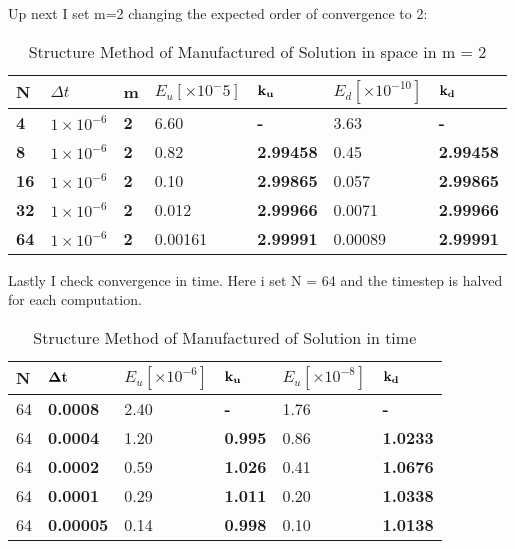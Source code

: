 Up next I set m=2 changing the expected order of convergence to 2:

\begin{table}[H]
\centering
\caption{Structure Method of Manufactured of Solution in space in m = 2}
\label{my-label}
\begin{tabular}{|l|l|l|l|l|l|l|}
\hline
\textbf{N} & $\Delta t$ & \textbf{m} & $E_u [\times 10^-5]$ & $\bold{k_u}$ & $E_d [\times 10^{-10}]$ & $\bold{k_d}$ \\ \hline
\textbf{4} & $1\times10^{-6}$ & \textbf{2} & 6.60 & \textbf{-} & 3.63 & \textbf{-} \\ \hline
\textbf{8} & $1\times10^{-6}$ & \textbf{2} & 0.82 & \textbf{2.99458} & 0.45 & \textbf{2.99458} \\ \hline
\textbf{16} & $1\times10^{-6}$ & \textbf{2} & 0.10 & \textbf{2.99865} & 0.057 & \textbf{2.99865} \\ \hline
\textbf{32} & $1\times10^{-6}$ & \textbf{2} & 0.012 & \textbf{2.99966} & 0.0071 & \textbf{2.99966} \\ \hline
\textbf{64} & $1\times10^{-6}$ & \textbf{2} & 0.00161 & \textbf{2.99991} & 0.00089 & \textbf{2.99991} \\ \hline
\end{tabular}
\end{table}

Lastly I check convergence in time. Here i set N = 64 and the timestep is halved for each computation.

\begin{table}[H]
\centering
\caption{Structure Method of Manufactured of Solution in time}
\label{my-label}
\begin{tabular}{|l|l|l|l|l|l|}
\hline
N & $\bold{\Delta t}$ & $E_u [\times10^{-6}]$ & $\bold{k_u}$ & $E_u [\times10^{-8}]$ & $\bold{k_d}$ \\ \hline
64 & \textbf{0.0008} & 2.40 & \textbf{-} & 1.76 & \textbf{-} \\ \hline
64 & \textbf{0.0004} & 1.20 & \textbf{0.995} & 0.86 & \textbf{1.0233} \\ \hline
64 & \textbf{0.0002} & 0.59 & \textbf{1.026} & 0.41 & \textbf{1.0676} \\ \hline
64 & \textbf{0.0001} & 0.29 & \textbf{1.011} & 0.20 & \textbf{1.0338} \\ \hline
64 & \textbf{0.00005} & 0.14 & \textbf{0.998} & 0.10 & \textbf{1.0138} \\ \hline
\end{tabular}
\end{table}



